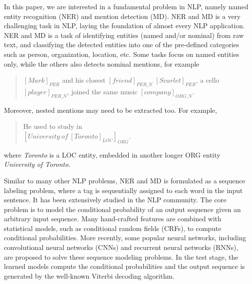 \documentclass[11pt,a4paper]{article}
\begin{document}
In this paper, we are interested in a fundamental problem in NLP, namely named entity recognition (NER) and mention detection (MD). NER and MD is a very challenging task in NLP, laying the foundation of almost every NLP application.
NER and MD is a task of identifying entities (named and/or nominal) from raw text, and classifying the detected entities into one of the pre-defined categories such as person, organization, location, etc. Some tasks focus on named entities only, 
while the others also detects nominal mentions, for example
\begin{quote}
	\label{emp:10types}
	\small
	$[Mark]_{PER}$ and his closest $[friend]_{PER\_N}$ $[Scarlet]_{PER}$, a cello $[player]_{PER\_N}$, joined the same music $[company]_{ORG\_N}$.
\end{quote}
Moreover, nested mentions may need to be extracted too. For example, 
\begin{quote}
	\label{emp:nested-ex}
	\small
	He used to study in \\  ${[University\ of\ {[Toronto]}_{LOC}]}_{ORG}$.
\end{quote}
where {\it Toronto} is a LOC entity, embedded in another longer ORG entity {\it University of Toronto}.

Similar to many other NLP problems, NER and MD is formulated as a sequence labeling problem, where a tag is sequentially assigned to each word in the input sentence. It has been extensively studied in the NLP community. The core problem is to model the conditional probability of an output sequence given an arbitrary input sequence. Many hand-crafted features are combined with statistical models, such as conditional random fields (CRFs), to compute conditional probabilities. More recently, some popular neural networks, including convolutional neural networks (CNNs) and recurrent neural networks (RNNs), are proposed to solve these sequence modeling problems.
In the test stage, the learned models compute the conditional probabilities and the output sequence is generated by the well-known Viterbi decoding algorithm. 
\end{document}
